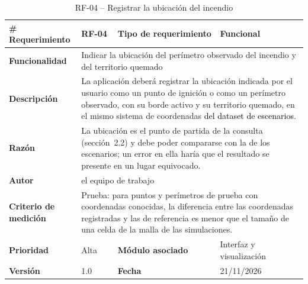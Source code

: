 \begin{longtable}{|p{\rqA}|p{\rqB}|p{\rqC}|p{\rqD}|}
  \caption{RF-04 -- Registrar la ubicación del incendio}\label{tab:rf-04}\tabularnewline
  \hline
  \textbf{\# Requerimiento} & RF-04 & \raggedright\textbf{Tipo de requerimiento} & Funcional\tabularnewline\hline
  \raggedright\textbf{Funcionalidad} & \multicolumn{3}{p{\rqBCD}|}{Indicar la ubicación del perímetro observado del incendio y del territorio quemado}\tabularnewline\hline
  \endfirsthead
  \textbf{Descripción} & \multicolumn{3}{p{\rqBCD}|}{La aplicación deberá registrar la ubicación indicada por el usuario como un punto de ignición o como un perímetro observado, con su borde activo y su territorio quemado, en el mismo sistema de coordenadas \textcolor{black}{del dataset de escenarios}.}\tabularnewline\hline
  \textbf{Razón} & \multicolumn{3}{p{\rqBCD}|}{La ubicación es el punto de partida de la consulta (sección~2.2) y debe poder compararse con la de los escenarios; un error en ella haría que el resultado se presente en un lugar equivocado.}\tabularnewline\hline
  \textbf{Autor} & \multicolumn{3}{p{\rqBCD}|}{el equipo de trabajo}\tabularnewline\hline
  \raggedright\textbf{Criterio de medición} & \multicolumn{3}{p{\rqBCD}|}{Prueba: para puntos y perímetros de prueba con coordenadas conocidas, la diferencia entre las coordenadas registradas y las de referencia es menor que el tamaño de una celda de la malla de las simulaciones.}\tabularnewline\hline
  \textbf{Prioridad} & Alta & \raggedright\textbf{Módulo asociado} & Interfaz y visualización\tabularnewline\hline
  \textbf{Versión} & 1.0 & \textbf{Fecha} & 21/11/2026\tabularnewline\hline
\end{longtable}

